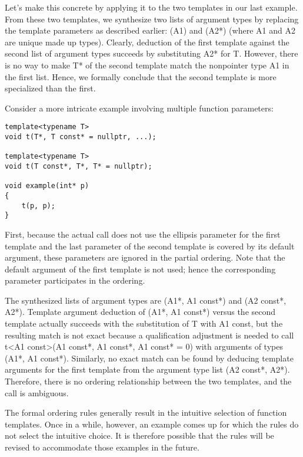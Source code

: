 Let’s make this concrete by applying it to the two templates in our last example. From these two templates, we synthesize two lists of argument types by replacing the template parameters as described earlier: (A1) and (A2*) (where A1 and A2 are unique made up types). Clearly, deduction of the first template against the second list of argument types succeeds by substituting A2* for T. However, there is no way to make T* of the second template match the nonpointer type A1 in the first list. Hence, we formally conclude that the second template is more specialized than the first.

Consider a more intricate example involving multiple function parameters:

\begin{lstlisting}[style=styleCXX]
template<typename T>
void t(T*, T const* = nullptr, ...);

template<typename T>
void t(T const*, T*, T* = nullptr);

void example(int* p)
{
	t(p, p);
}
\end{lstlisting}

First, because the actual call does not use the ellipsis parameter for the first template and the last parameter of the second template is covered by its default argument, these parameters are ignored in the partial ordering. Note that the default argument of the first template is not used; hence the corresponding parameter participates in the ordering.

The synthesized lists of argument types are (A1*, A1 const*) and (A2 const*, A2*). Template argument deduction of (A1*, A1 const*) versus the second template actually succeeds with the substitution of T with A1 const, but the resulting match is not exact because a qualification adjustment is needed to call t<A1 const>(A1 const*, A1 const*, A1 const* = 0) with arguments of types (A1*, A1 const*). Similarly, no exact match can be found by deducing template arguments for the first template from the argument type list (A2 const*, A2*). Therefore, there is no ordering relationship between the two templates, and the call is ambiguous.

The formal ordering rules generally result in the intuitive selection of function templates. Once in a while, however, an example comes up for which the rules do not select the intuitive choice. It is therefore possible that the rules will be revised to accommodate those examples in the future.


